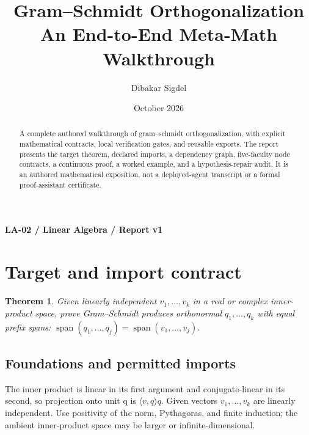 \documentclass[preprint,12pt,aps,pra,showkeys,amsmath,amssymb,superscriptaddress,floatfix]{revtex4-2}
\newtheorem{theorem}{Theorem}[section]
\theoremstyle{definition}
\theoremstyle{remark}
\begin{document}
\title{Gram--Schmidt Orthogonalization\\[4pt]\large An End-to-End Meta-Math Walkthrough}

\author{Dibakar Sigdel}


\date{October 2026}

\begin{abstract}

A complete authored walkthrough of gram--schmidt orthogonalization, with
explicit mathematical contracts, local verification gates, and reusable
exports. The report presents the target theorem, declared imports, a
dependency graph, five-faculty node contracts, a continuous proof, a
worked example, and a hypothesis-repair audit. It is an authored
mathematical exposition, not a deployed-agent transcript or a formal
proof-assistant certificate.

\end{abstract}\maketitle\linespread{1.12}\selectfont

\noindent\textbf{LA-02 / Linear Algebra / Report v1}

\section{Target and import contract}

\begin{theorem}

Given linearly independent \(v_1,\ldots,v_k\) in a real or complex
inner-product space, prove Gram--Schmidt produces orthonormal
\(q_1,\ldots,q_k\) with equal prefix spans:
\(\operatorname{span}(q_1,\ldots,q_j)=\operatorname{span}(v_1,\ldots,v_j)\).

\end{theorem}

\subsection{Foundations and permitted imports}

The inner product is linear in its first argument and conjugate-linear
in its second, so projection onto unit q is \(\langle v,q\rangle q\).
Given vectors \(v_{1},\ldots ,v_k\) are linearly independent. Use
positivity of the norm, Pythagoras, and finite induction; the ambient
inner-product space may be larger or infinite-dimensional.
\end{document}
